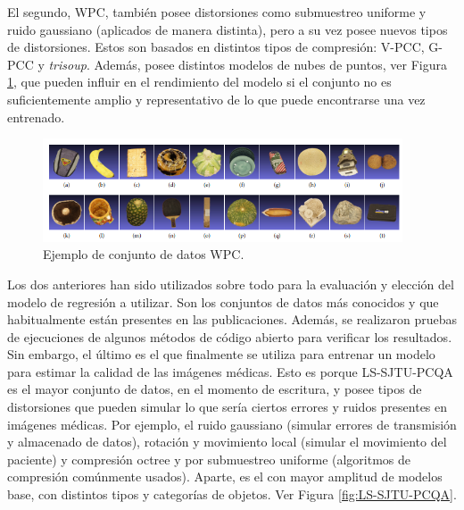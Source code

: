 El segundo, WPC\cite{WPC1, WPC2}, también posee distorsiones como submuestreo uniforme y 
ruido gaussiano (aplicados de manera distinta), pero a su vez posee nuevos tipos 
de distorsiones. Estos son basados en distintos tipos de compresión: V-PCC, G-PCC y \emph{trisoup}.
Además, posee distintos modelos de nubes de puntos, ver Figura \ref{fig:WPC}, que 
pueden influir en el rendimiento del modelo si el conjunto no es
suficientemente amplio y representativo de lo que puede encontrarse una vez entrenado. 

\begin{figure}[htp]
  \begin{center}
    \includegraphics[width=0.95\textwidth]{imagenes/chapter4/WPC}
  \end{center}
  \caption{Ejemplo de conjunto de datos WPC\cite{WPC1, WPC2}.}
  \label{fig:WPC}
\end{figure}

Los dos anteriores han sido utilizados sobre todo para la evaluación y elección 
del modelo de regresión a utilizar. Son los conjuntos de datos más conocidos 
y que habitualmente están presentes en las publicaciones. Además, se realizaron 
pruebas de ejecuciones de algunos métodos de código abierto para verificar los 
resultados. Sin embargo, el último es el que finalmente se utiliza para entrenar un modelo para estimar 
la calidad de las imágenes médicas. Esto es porque LS-SJTU-PCQA\cite{ResSCNN} 
es el mayor conjunto de datos, 
en el momento de escritura, y posee tipos de distorsiones que pueden simular 
lo que sería ciertos errores y ruidos presentes en imágenes médicas. Por ejemplo, 
el ruido gaussiano (simular errores de transmisión y almacenado de datos), 
rotación y movimiento local (simular el movimiento del paciente) y compresión 
octree y por submuestreo uniforme (algoritmos de compresión comúnmente usados).
Aparte, es el con mayor amplitud de modelos base, con distintos tipos y categorías 
de objetos. Ver Figura \ref{fig:LS-SJTU-PCQA}.

